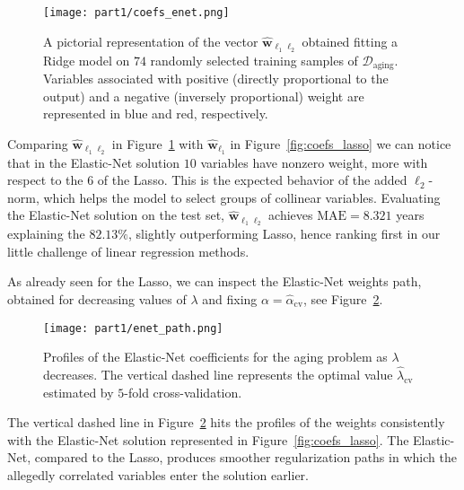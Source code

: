 			\begin{figure}[!h]
				\centering
				\texttt{[image: part1/coefs\_enet.png]}
				\caption{A pictorial representation of the vector $\bm{\hat w}_{\ell_1\ell_2}$ obtained fitting a Ridge model on $74$ randomly selected training samples of $\mathcal{D}_{\text{aging}}$. Variables associated with positive (\ie directly proportional to the output) and a negative (\ie inversely proportional) weight are represented in blue and red, respectively.} \label{fig:coefs_enet}
		  \end{figure}

			Comparing $\bm{\hat w}_{\ell_1\ell_2}$ in Figure~\ref{fig:coefs_enet} with $\bm{\hat w}_{\ell_1}$ in Figure~\ref{fig:coefs_lasso} we can notice that in the Elastic-Net solution $10$ variables have nonzero weight, more with respect to the $6$ of the Lasso. This is the expected behavior of the added $\ell_2$-norm, which helps the model to select groups of collinear variables. Evaluating the Elastic-Net solution on the test set, $\bm{\hat w}_{\ell_1\ell_2}$ achieves $\text{MAE} = 8.321$ years explaining the $82.13\%$, slightly outperforming Lasso, hence ranking first in our little challenge of linear regression methods.

			As already seen for the Lasso, we can inspect the Elastic-Net weights path, obtained for decreasing values of $\lambda$ and fixing $\alpha = \hat \alpha_{\text{cv}}$, see Figure~\ref{fig:enet_path}.
			\begin{figure}[!h]
				\centering
				\texttt{[image: part1/enet\_path.png]}
				\caption{Profiles of the Elastic-Net coefficients for the aging problem as $\lambda$ decreases. The vertical dashed line represents the optimal value $\hat \lambda_{\text{cv}}$ estimated by $5$-fold cross-validation.} \label{fig:enet_path}
			\end{figure}
			The vertical dashed line in Figure~\ref{fig:enet_path} hits the profiles of the weights consistently with the Elastic-Net solution represented in Figure~\ref{fig:coefs_lasso}. The Elastic-Net, compared to the Lasso, produces smoother regularization paths in which the allegedly correlated variables enter the solution earlier.

